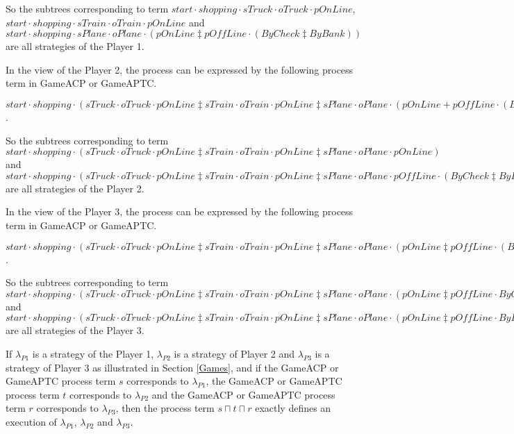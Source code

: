 \documentclass{fac}
\begin{document}
So the subtrees corresponding to term $start\cdot shopping\cdot sTruck\cdot oTruck\cdot pOnLine$, $start\cdot shopping\cdot sTrain\cdot oTrain\cdot pOnLine$ and $start\cdot shopping\cdot sPlane \cdot oPlane \cdot (pOnLine \ddagger pOffLine \cdot(ByCheck \ddagger ByBank))$ are all strategies of the Player 1.

In the view of the Player 2, the process can be expressed by the following process term in GameACP or GameAPTC.

$start\cdot shopping\cdot (sTruck\cdot oTruck\cdot pOnLine \ddagger sTrain\cdot oTrain\cdot pOnLine \ddagger sPlane \cdot oPlane \cdot (pOnLine + pOffLine \cdot (ByCheck \ddagger ByBank)))$.

So the subtrees corresponding to term $start\cdot shopping\cdot (sTruck\cdot oTruck\cdot pOnLine \ddagger sTrain\cdot oTrain\cdot pOnLine \ddagger sPlane \cdot oPlane \cdot pOnLine)$ and $start\cdot shopping\cdot (sTruck\cdot oTruck\cdot pOnLine \ddagger sTrain\cdot oTrain\cdot pOnLine \ddagger sPlane \cdot oPlane \cdot pOffLine \cdot (ByCheck \ddagger ByBank))$ are all strategies of the Player 2.

In the view of the Player 3, the process can be expressed by the following process term in GameACP or GameAPTC.

$start\cdot shopping\cdot (sTruck\cdot oTruck\cdot pOnLine \ddagger sTrain\cdot oTrain\cdot pOnLine \ddagger sPlane \cdot oPlane \cdot (pOnLine \ddagger pOffLine \cdot (ByCheck + ByBank)))$.

So the subtrees corresponding to term $start\cdot shopping\cdot (sTruck\cdot oTruck\cdot pOnLine \ddagger sTrain\cdot oTrain\cdot pOnLine \ddagger sPlane \cdot oPlane \cdot (pOnLine \ddagger pOffLine \cdot ByCheck))$ and $start\cdot shopping\cdot (sTruck\cdot oTruck\cdot pOnLine \ddagger sTrain\cdot oTrain\cdot pOnLine \ddagger sPlane \cdot oPlane \cdot (pOnLine \ddagger pOffLine \cdot ByBank))$ are all strategies of the Player 3.

If $\lambda_{P1}$ is a strategy of the Player 1, $\lambda_{P2}$ is a strategy of Player 2 and $\lambda_{P3}$ is a strategy of Player 3 as illustrated in Section \ref{Games}, and if the GameACP or GameAPTC process term $s$ corresponds to $\lambda_{P1}$, the GameACP or GameAPTC process term $t$ corresponds to $\lambda_{P2}$ and the GameACP or GameAPTC process term $r$ corresponds to $\lambda_{P3}$, then the process term $s \sqcap t \sqcap r$ exactly defines an execution of $\lambda_{P1}$, $\lambda_{P2}$ and $\lambda_{P3}$.
\end{document}
